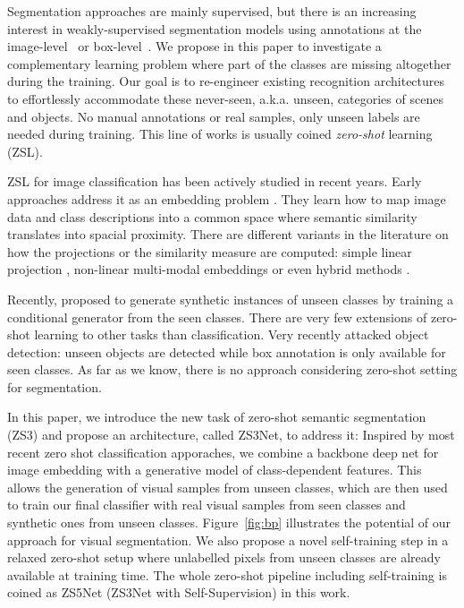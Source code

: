 \documentclass{article}
\begin{document}
Segmentation approaches are mainly supervised, but there is an increasing interest in weakly-supervised segmentation models using annotations at the image-level~\cite{papandreou2015weakly,pathak2015constrained} or box-level~\cite{dai2015boxsup}.
We propose in this paper to investigate a complementary learning problem where part of the classes are missing altogether during the training. Our goal is to re-engineer existing recognition architectures to effortlessly accommodate these never-seen, a.k.a. unseen, categories of scenes and objects.
No manual annotations or real samples, only unseen labels are needed during training. This line of works is usually coined \textit{zero-shot} learning (ZSL).


ZSL for image classification has been actively studied in recent years.  Early approaches address it as an embedding problem \cite{akata2015label, akata2015evaluation, bucher2016improving, changpinyo2016synthesized, frome2013devise, kodirov2017semantic, norouzi2013zero, romera2015embarrassingly, socher2013zero, verma2017simple, xian2016latent, zhang2015zero}.
They learn how to map image data and class descriptions into a common space where semantic similarity translates into spacial proximity. There are different variants in the literature on how the projections or the similarity measure are computed: simple linear projection  \cite{akata2015label, akata2015evaluation, bucher2016improving, frome2013devise, kodirov2017semantic, romera2015embarrassingly},  non-linear  multi-modal embeddings \cite{socher2013zero, xian2016latent} or even hybrid methods \cite{changpinyo2016synthesized, norouzi2013zero, verma2017simple, zhang2015zero}. 

Recently, \cite{bucher2017generating, kumar2018generalized, xian2018feature} proposed to generate synthetic instances of unseen classes by training a conditional generator from the seen classes. There are very few extensions of zero-shot learning to other tasks than classification. Very recently \cite{bansal2018zero, demirel2018zero, rahman2018zero, zhu2019zero} attacked object detection: unseen objects are detected while box annotation is only available for seen classes. As far as we know, there is no approach considering zero-shot setting for segmentation.

In this paper, we introduce the new task of zero-shot semantic segmentation (ZS3) and propose an architecture, called ZS3Net, to address it: Inspired by most recent zero shot classification apporaches, we combine a backbone deep net for image embedding with a generative model of class-dependent features. This allows the generation of visual samples from unseen classes, which are then used to train our final classifier with real visual samples from seen classes and synthetic ones from unseen classes. 
Figure~\ref{fig:bp} illustrates the potential of our approach for visual segmentation.
We also propose a novel self-training step in a relaxed zero-shot setup where unlabelled pixels from unseen classes are already available at training time. The whole zero-shot pipeline including self-training is coined as ZS5Net (ZS3Net with Self-Supervision) in this work.
\end{document}
